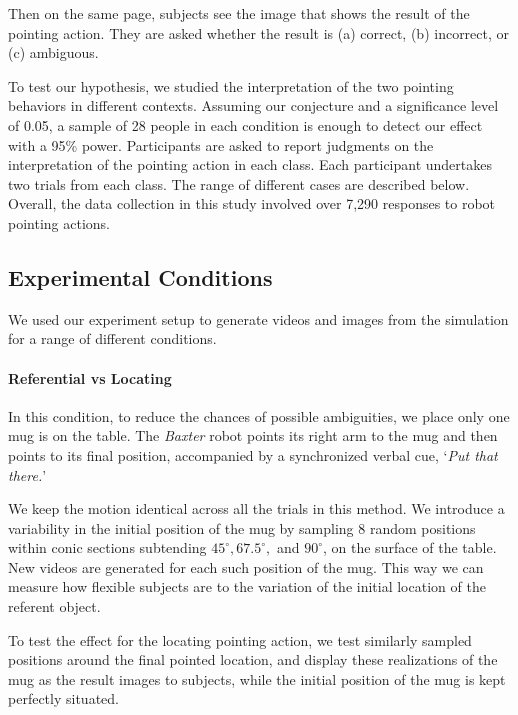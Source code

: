 Then on the same page, subjects see the image that shows the result of the pointing action. They are asked whether the result is (a) correct, (b) incorrect, or (c) ambiguous.  

To test our hypothesis, we studied the interpretation of the two pointing behaviors in different contexts. Assuming our conjecture and a significance level of 0.05, a sample of 28 people in each condition is enough to detect our effect with a 95\% power.  Participants are asked to report judgments on the interpretation of the pointing action in each class.  Each participant undertakes two trials from each class.  The range of different cases are described below.  Overall, the data collection in this study involved over 7,290 responses to robot pointing actions.

\subsection{Experimental Conditions}

We used our experiment setup to generate videos and images from the simulation for a range of different conditions.

\paragraph{Referential vs Locating}
In this condition, to reduce the chances of possible ambiguities, we place only one mug is on the table. The \textit{Baxter} robot points its right arm to the mug and then points to its final position, accompanied by a synchronized verbal cue, `\textit{Put that there.}'


We keep the motion identical across all the trials in this method. 
We introduce a variability in the initial position of the mug by sampling $8$ random positions within conic sections subtending $45^{\circ} , 67.5^{\circ}, $ and $90^{\circ}$, on the surface of the table. New videos are generated for each such position of the mug.
This way we can measure how flexible subjects are to the variation of the initial location of the referent object. 

To test the effect for the locating pointing action, we test similarly sampled positions around the final pointed location, and display these realizations of the mug as the result images to subjects, while the initial position of the mug is kept perfectly situated. 

